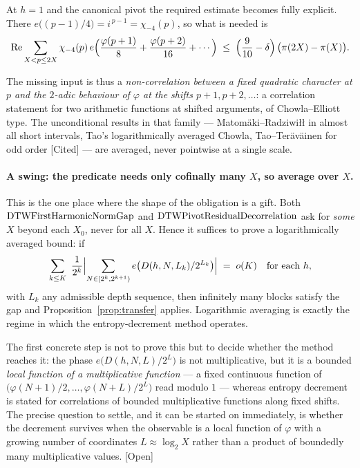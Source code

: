 \documentclass[11pt]{article}
\theoremstyle{plain}
\theoremstyle{definition}
\theoremstyle{remark}
\let\origmathrm\mathrm
\renewcommand{\mathrm}[1]{\ifmmode\origmathrm{#1}\else\textrm{#1}\fi}%
\newcommand{\ev}[1]{{\small\textsf{[#1]}}\xspace}
\begin{document}
At $h=1$ and the canonical pivot the required estimate becomes fully
explicit. There $e\bigl((p-1)/4\bigr)=i^{\,p-1}=\chi_{-4}(p)$, so what is
needed is
\[
  \operatorname{Re}\sum_{X<p\le 2X}\chi_{-4}(p)\,
    e\Bigl(\frac{\varphi(p+1)}{8}+\frac{\varphi(p+2)}{16}+\cdots\Bigr)
  \;\le\;\Bigl(\frac{9}{10}-\delta\Bigr)\,\bigl(\pi(2X)-\pi(X)\bigr).
\]

The missing input is thus a \emph{non-correlation between a fixed quadratic
character at $p$ and the $2$-adic behaviour of $\varphi$ at the shifts
$p+1,p+2,\dots$}: a correlation statement for two arithmetic functions at
shifted arguments, of Chowla--Elliott type. The unconditional results in that
family --- Matom\"aki--Radziwi\l{}\l{} in almost all short intervals, Tao's
logarithmically averaged Chowla, Tao--Ter\"av\"ainen for odd order
\ev{Cited} --- are averaged, never pointwise at a single scale.

\paragraph{A swing: the predicate needs only cofinally many $X$, so average
over $X$.} This is the one place where the shape of the obligation is a gift.
Both $\mathrm{DTWFirstHarmonicNormGap}$ and
$\mathrm{DTWPivotResidualDecorrelation}$ ask for \emph{some} $X$ beyond each
$X_0$, never for all $X$. Hence it suffices to prove a logarithmically
averaged bound: if
\[
  \sum_{k\le K}\ \frac{1}{2^{k}}
  \Bigl|\sum_{N\in[2^{k},2^{k+1})}e\bigl(D(h,N,L_k)/2^{L_k}\bigr)\Bigr|
  \;=\;o(K)
  \quad\text{for each }h,
\]
with $L_k$ any admissible depth sequence, then infinitely many blocks satisfy
the gap and Proposition~\ref{prop:transfer} applies. Logarithmic averaging is
exactly the regime in which the entropy-decrement method operates.

The first
concrete step is not to prove this but to decide whether the method reaches
it: the phase $e\bigl(D(h,N,L)/2^{L}\bigr)$ is not multiplicative, but it is
a bounded \emph{local function of a multiplicative function} --- a fixed
continuous function of $\bigl(\varphi(N+1)/2,\dots,\varphi(N+L)/2^{L}\bigr)$
read modulo $1$ --- whereas entropy decrement is stated for correlations of
bounded multiplicative functions along fixed shifts. The precise question to
settle, and it can be started on immediately, is whether the decrement
survives when the observable is a local function of $\varphi$ with a growing
number of coordinates $L\approx\log_2X$ rather than a product of boundedly
many multiplicative values. \ev{Open}
\end{document}
